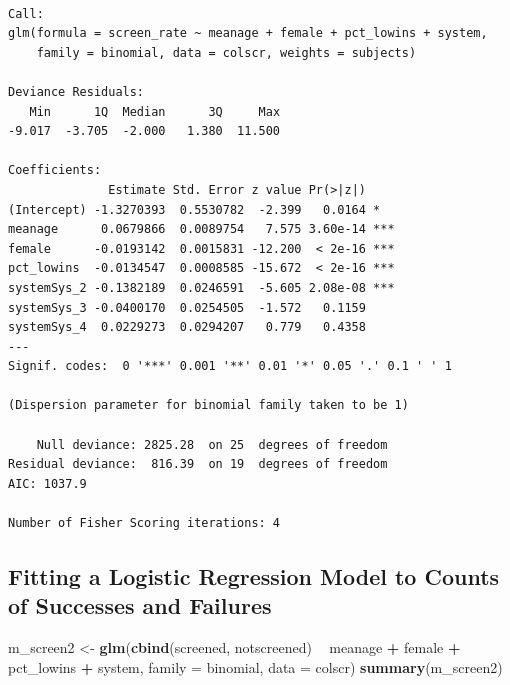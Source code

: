 \documentclass[]{book}
\newenvironment{Shaded}{\begin{snugshade}}{\end{snugshade}}
\newcommand{\KeywordTok}[1]{\textcolor[rgb]{0.13,0.29,0.53}{\textbf{#1}}}
\newcommand{\DataTypeTok}[1]{\textcolor[rgb]{0.13,0.29,0.53}{#1}}
\newcommand{\StringTok}[1]{\textcolor[rgb]{0.31,0.60,0.02}{#1}}
\newcommand{\OperatorTok}[1]{\textcolor[rgb]{0.81,0.36,0.00}{\textbf{#1}}}
\newcommand{\NormalTok}[1]{#1}
\theoremstyle{definition}
\theoremstyle{definition}
\theoremstyle{definition}
\theoremstyle{remark}
\begin{document}
\begin{verbatim}

Call:
glm(formula = screen_rate ~ meanage + female + pct_lowins + system, 
    family = binomial, data = colscr, weights = subjects)

Deviance Residuals: 
   Min      1Q  Median      3Q     Max  
-9.017  -3.705  -2.000   1.380  11.500  

Coefficients:
              Estimate Std. Error z value Pr(>|z|)    
(Intercept) -1.3270393  0.5530782  -2.399   0.0164 *  
meanage      0.0679866  0.0089754   7.575 3.60e-14 ***
female      -0.0193142  0.0015831 -12.200  < 2e-16 ***
pct_lowins  -0.0134547  0.0008585 -15.672  < 2e-16 ***
systemSys_2 -0.1382189  0.0246591  -5.605 2.08e-08 ***
systemSys_3 -0.0400170  0.0254505  -1.572   0.1159    
systemSys_4  0.0229273  0.0294207   0.779   0.4358    
---
Signif. codes:  0 '***' 0.001 '**' 0.01 '*' 0.05 '.' 0.1 ' ' 1

(Dispersion parameter for binomial family taken to be 1)

    Null deviance: 2825.28  on 25  degrees of freedom
Residual deviance:  816.39  on 19  degrees of freedom
AIC: 1037.9

Number of Fisher Scoring iterations: 4
\end{verbatim}

\subsection{Fitting a Logistic Regression Model to Counts of Successes
and
Failures}\label{fitting-a-logistic-regression-model-to-counts-of-successes-and-failures}

\begin{Shaded}
\begin{Highlighting}[]
\NormalTok{m_screen2 <-}\StringTok{  }\KeywordTok{glm}\NormalTok{(}\KeywordTok{cbind}\NormalTok{(screened, notscreened) }\OperatorTok{~}\StringTok{ }
\StringTok{                    }\NormalTok{meanage }\OperatorTok{+}\StringTok{ }\NormalTok{female }\OperatorTok{+}\StringTok{ }\NormalTok{pct_lowins }\OperatorTok{+}\StringTok{ }\NormalTok{system, }
           \DataTypeTok{family =}\NormalTok{ binomial, }\DataTypeTok{data =}\NormalTok{ colscr)}
\KeywordTok{summary}\NormalTok{(m_screen2)}
\end{Highlighting}
\end{Shaded}
\end{document}
